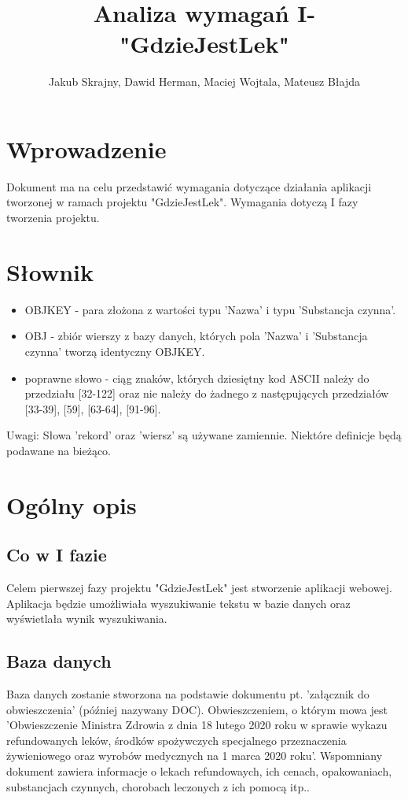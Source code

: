 \documentclass[10pt, a4paper]{article}
\author{Jakub Skrajny, Dawid Herman, Maciej Wojtala, Mateusz Błajda}
\title{Analiza wymagań I- "GdzieJestLek"}
\begin{document}
\maketitle
\section{Wprowadzenie}
 Dokument ma na celu przedstawić wymagania dotyczące działania aplikacji tworzonej w ramach projektu "GdzieJestLek". Wymagania dotyczą I fazy tworzenia projektu.
\section{Słownik}
\begin{itemize}
\item OBJKEY - para złożona z wartości typu 'Nazwa' i typu 'Substancja czynna'.
\item OBJ - zbiór wierszy z bazy danych, których pola 'Nazwa' i 'Substancja czynna' tworzą identyczny OBJKEY.
\item poprawne słowo - ciąg znaków, których dziesiętny kod ASCII należy do przedziału [32-122] oraz nie należy do żadnego z następujących przedziałów [33-39], [59], [63-64], [91-96].
\end{itemize}
Uwagi:\newline
Słowa 'rekord' oraz 'wiersz' są używane zamiennie. \newline
Niektóre definicje będą podawane na bieżąco.
\section{Ogólny opis}
\subsection{Co w I fazie}
Celem pierwszej fazy projektu "GdzieJestLek" jest stworzenie aplikacji webowej. Aplikacja będzie umożliwiała wyszukiwanie tekstu w bazie danych oraz wyświetlała wynik wyszukiwania.
\subsection{Baza danych}
Baza danych zostanie stworzona na podstawie dokumentu pt.
'załącznik do obwieszczenia' (później nazywany DOC). Obwieszczeniem, o którym mowa jest 'Obwieszczenie Ministra Zdrowia z dnia 18 lutego 2020 roku w sprawie wykazu refundowanych leków, środków spożywczych specjalnego przeznaczenia żywieniowego oraz wyrobów medycznych na 1 marca 2020 roku'. Wspomniany dokument zawiera informacje o lekach refundowaych, ich cenach, opakowaniach, substancjach czynnych, chorobach leczonych z ich pomocą itp..
\end{document}
